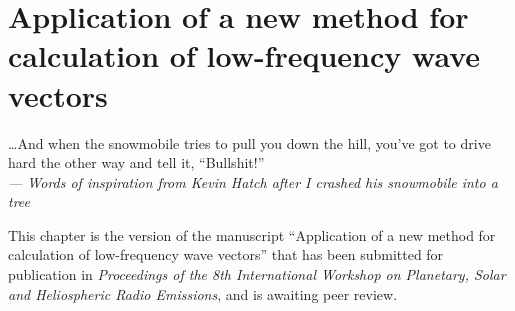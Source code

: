
\chapter{Application of a new method for calculation of low-frequency
  wave vectors}
\label{chp:5}

\begin{flushright}
  \begin{minipage}[]{0.5\linewidth}
    \begin{flushright}
      \dots And when the snowmobile tries to pull you down the hill, you've got
      to drive hard the other way and tell it, ``Bullshit!''  \\{\small
        \emph{--- Words of inspiration from Kevin Hatch after I crashed his
          snowmobile into a tree } }
    \end{flushright}
  \end{minipage}
\end{flushright}
\vspace{\baselineskip}

This chapter is the version of the manuscript ``Application of a new method for
calculation of low-frequency wave vectors'' that has been submitted for
publication in \textsl{Proceedings of the 8th International Workshop on
  Planetary, Solar and Heliospheric Radio Emissions}, and is awaiting peer
review.

